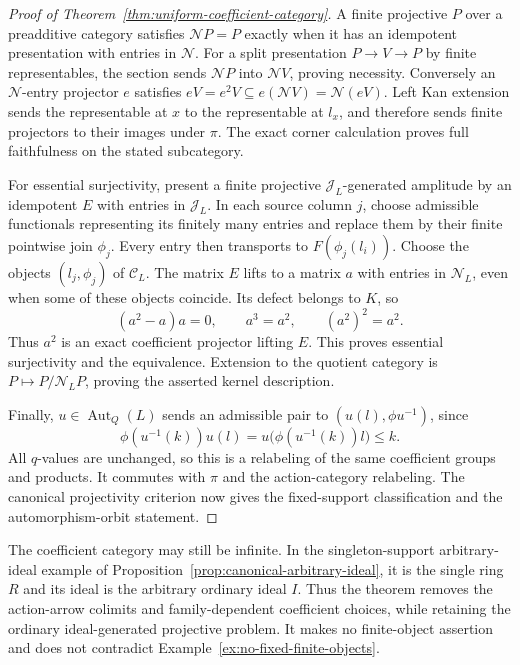 \begin{proof}[Proof of Theorem~\ref{thm:uniform-coefficient-category}]
A finite projective $P$ over a preadditive category satisfies
$\mathcal NP=P$ exactly when it has an idempotent presentation
with entries in $\mathcal N$. For a split presentation
$P\to V\to P$ by finite representables, the section sends
$\mathcal NP$ into $\mathcal NV$, proving necessity.
Conversely an $\mathcal N$-entry projector $e$ satisfies
$eV=e^2V\subseteq e(\mathcal NV)=\mathcal N(eV)$.
Left Kan extension sends the representable at $x$ to the
representable at $l_x$, and therefore sends finite projectors
to their images under $\pi$. The exact corner calculation
proves full faithfulness on the stated subcategory.

For essential surjectivity, present a finite projective
$\mathcal J_L$-generated amplitude by an idempotent $E$ with
entries in $\mathcal J_L$. In each source column $j$, choose
admissible functionals representing its finitely many entries
and replace them by their finite pointwise join $\phi_j$.
Every entry then transports to $F(\phi_j(l_i))$.
Choose the objects $(l_j,\phi_j)$ of $\mathcal C_L$.
The matrix $E$ lifts to a matrix $a$ with entries in
$\mathcal N_L$, even when some of these objects coincide.
Its defect belongs to $K$, so
\[
 (a^2-a)a=0,\qquad a^3=a^2,\qquad (a^2)^2=a^2.
\]
Thus $a^2$ is an exact coefficient projector lifting $E$.
This proves essential surjectivity and the equivalence.
Extension to the quotient category is $P\mapsto
P/\mathcal N_LP$, proving the asserted kernel description.

Finally, $u\in\operatorname{Aut}_Q(L)$ sends an admissible
pair to $(u(l),\phi u^{-1})$, since
\[
 \phi(u^{-1}(k))u(l)=u\bigl(\phi(u^{-1}(k))l\bigr)\leq k.
\]
All $q$-values are unchanged, so this is a relabeling of the
same coefficient groups and products. It commutes with $\pi$
and the action-category relabeling. The canonical projectivity
criterion now gives the fixed-support classification and the
automorphism-orbit statement.
\end{proof}

The coefficient category may still be infinite. In the
singleton-support arbitrary-ideal example of
Proposition~\ref{prop:canonical-arbitrary-ideal}, it is the
single ring $R$ and its ideal is the arbitrary ordinary ideal
$I$. Thus the theorem removes the action-arrow colimits and
family-dependent coefficient choices, while retaining the
ordinary ideal-generated projective problem. It makes no
finite-object assertion and does not contradict
Example~\ref{ex:no-fixed-finite-objects}.
